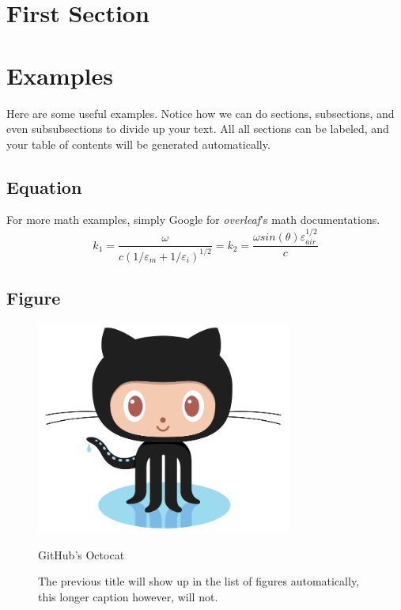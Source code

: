 \section{First Section}
\lipsum[1-2]

\section{Examples}
Here are some useful examples. Notice how we can do sections, subsections, and even subsubsections to divide up your text. All all sections can be labeled, and your table of contents will be generated automatically.

\subsection{Equation}
For more math examples, simply Google for \textit{overleaf}'s math documentations.
\begin{equation}
k_1=\frac{\omega }{c({1/\varepsilon_m + 1/\varepsilon_i})^{1/2}}=k_2=\frac{\omega
sin(\theta)\varepsilon_{air}^{1/2}}{c}
\end{equation}

\lipsum[3]

\subsection{Figure}
\begin{figure}
\centering
\includegraphics[width=0.75\textwidth]{../figures/octocat.png}
\caption{GitHub's Octocat}
\caption*{The previous title will show up in the list of figures automatically, this longer caption however, will not.}
\label{fig:octocat}
\end{figure}

